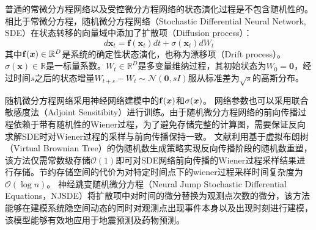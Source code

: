 普通的常微分方程网络以及受控微分方程网络的状态演化过程是不包含随机性的。
相比于常微分方程，随机微分方程网络（Stochastic Differential Neural Network, SDE）在状态转移的向量域中添加了扩散项（Diffusion process）：
\begin{equation}
    d \mathbf{x}_t=\mathbf{f}\left(\mathbf{x}_t\right) d t+\sigma\left(\mathbf{x}_t\right) d W_t
    \label{equ:sde}
\end{equation}
其中$\mathbf{f}(\boldsymbol x)\in \mathbb{R}^D$是系统的确定性状态演化，也称为漂移项（Drift process）。$\sigma(\mathbf x)\in \mathbb{R}$是一标量系数。$W_t \in \mathbb{R}^D$是多变量维纳过程，其初始状态为$W_0 =\mathbf{0}$，经过时间$s$之后的状态增量$W_{t+s}-W_t \sim \mathcal{N}(\mathbf{0}, s I)$服从标准差为$\sqrt{s}$的高斯分布。

随机微分方程网络采用神经网络建模中的$\mathbf{f}(\boldsymbol x)$和$\sigma(\boldsymbol x)$。
网络参数也可以采用联合敏感度法（Adjoint Sensitibity）进行训练\cite{li2020scalable}。由于随机微分方程网络的前向传播过程依赖于带有随机性的Wiener过程，为了避免存储完整的计算图，需要保证反向求解SDE时对Wiener过程的采样与前向传播保持一致。
文献\cite{li2020scalable}利用基于虚拟布朗树（Virtual Brownian Tree）的伪随机数生成策略实现反向传播阶段的随机数重塑，该方法仅需常数级存储$\mathcal{O}(1)$即可对SDE网络前向传播的Wiener过程采样结果进行存储。节约存储空间的代价为对特定时间点下的wiener过程采样时间复杂度为$\mathcal{O}(\log n)$。
神经跳变随机微分方程（Neural Jump Stochastic Differential Equations，NJSDE）\cite{Jia2019}将扩散项中对时间的微分替换为观测点次数的微分，该方法能够在建模系统隐空间动态的同时对观测点出现事件本身以及出现时刻进行建模，该模型能够有效地应用于地震预测及药物预测。


